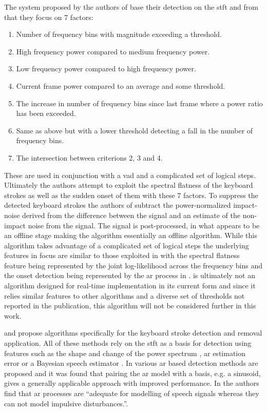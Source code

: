 The system proposed by the authors of \cite{Sugiyama2007} base their detection on the \gls{stft} and from that they focus on 7 factors:
\begin{enumerate}
\item Number of frequency bins with magnitude exceeding a threshold.
\item High frequency power compared to medium frequency power.
\item Low frequency power compared to high frequency power.
\item Current frame power compared to an average and some threshold.
\item The increase in number of frequency bins since last frame where a power ratio has been exceeded.
\item Same as above but with a lower threshold detecting a fall in the number of frequency bins.
\item The intersection between criterions 2, 3 and 4.
\end{enumerate}
These are used in conjunction with a \gls{vad} and a complicated set of logical steps. Ultimately the authors attempt to exploit the spectral flatness of the keyboard strokes as well as the sudden onset of them with these 7 factors. 
To suppress the detected keyboard strokes the authors of \cite{Sugiyama2007} subtract the power-normalized impact-noise derived from the difference between the signal and an estimate of the non-impact noise from the signal. The signal is post-processed, in what appears to be an offline stage making the algorithm essentially an offline algorithm. While this algorithm takes advantage of a complicated set of logical steps the underlying features in focus are similar to those exploited in \cite{Subramanya2007} with the spectral flatness feature being represented by the joint log-likelihood across the frequency bins and the onset detection being represented by the \gls{ar} process in \cite{Subramanya2007}. \cite{Sugiyama2007} is ultimately not an algorithm designed for real-time implementation in its current form and since it relies similar features to other algorithms and a diverse set of thresholds not reported in the publication, this algorithm will not be considered further in this work.



and \cite{Sugiyama2007} propose algorithms specifically for the keyboard stroke detection and removal application. All of these methods rely on the \gls{stft} as a basis for detection using features such as the shape and change of the power spectrum \cite{Sugiyama2007}, \gls{ar} estimation error \cite{Subramanya2007}\cite{Kauppinen2002} or a Bayesian speech estimator \cite{Abramson2007}. In \cite{Godsill1998book} various \gls{ar} based detection methods are proposed and it was found that pairing the \gls{ar} model with a basis, e.g. a sinusoid, gives a generally applicable approach with improved performance. In \cite{Vaseghi1990} the authors find that \gls{ar} processes are ``adequate for modelling of speech signals whereas they can not model impulsive disturbances.''.

